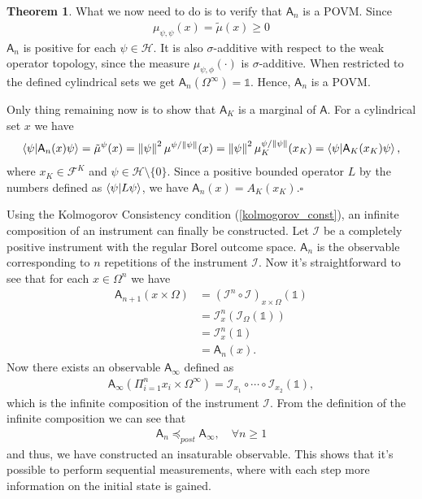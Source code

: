 \documentclass[a4paper,12pt]{wihuri}
\theoremstyle{definition}
\newtheorem{theorem}{Theorem}
\numberwithin{definition}{section}
\numberwithin{example}{section}
\numberwithin{theorem}{section}
\numberwithin{proposition}{section}
\numberwithin{lemma}{section}
\newcommand{\I}{\mathcal{I}}%
\newcommand{\hi}{\mathcal{H}}%
\newcommand{\salg}{\mathcal{F}}%
\newcommand{\A}{\mathsf{A}}%
\newcommand{\id}{\mathds{1}}
\newcommand{\norm}[1]{\left\lVert#1\right\rVert}
\newcommand{\pp}{\preceq_{post}}
\begin{document}
\begin{theorem}
What we now need to do is to verify that $\A_n$ is a POVM. Since
\begin{align*}
\mu_{\psi,\psi}(x) = \tilde{\mu}(x) \geq 0
\end{align*}
$\A_n$ is positive for each $\psi \in \hi$. It is also $\sigma$-additive with respect to the weak operator topology, since the measure $\mu_{\psi,\phi}(\cdot)$ is $\sigma$-additive. When restricted to the defined cylindrical sets we get $\A_n(\Omega^\infty) = \id$. Hence, $\A_n$ is a POVM. 

Only thing remaining now is to show that $\A_K$ is a marginal of $\A$. For a cylindrical set $x$ we have
\begin{align*}
 \braket{\psi| \A_n(x)\psi} = \tilde{\mu}^\psi(x) = \norm{\psi}^2\mu^{\psi/\norm{\psi}}(x) = \norm{\psi}^2\mu_K^{\psi/\norm{\psi}}(x_K) = \braket{\psi|\A_K(x_K)\psi},
\end{align*}
where $x_K \in \salg^K$ and $\psi \in \hi \setminus \{0\}$. Since a positive bounded operator $L$ by the numbers defined as $\braket{\psi|L\psi}$, we have $\A_n(x) = A_K(x_K)$.\hfill $\square$
\end{theorem}
Using the Kolmogorov Consistency condition (\ref{kolmogorov_const}), an infinite composition of an instrument can finally be constructed. Let $\I$ be a completely positive instrument with the regular Borel outcome space. $\A_n$ is the observable corresponding to $n$ repetitions of the instrument $\I$. Now it's straightforward to see that for each $x \in \Omega^n$ we have
\begin{align*}
\A_{n+1}(x\times \Omega) &= (\I^n \circ \I)_{x\times\Omega}(\id) \\
&= \I_x^n(\I_\Omega(\id))\\
&= \I_x^n(\id)\\
&= \A_n(x).
\end{align*}
Now there exists an observable $\A_\infty$ defined as 
\begin{align*}
\A_\infty(\Pi_{i=1}^n x_i \times \Omega^\infty) = \I_{x_1}\circ \cdots \circ \I_{x_2}(\id),
\end{align*}
which is the infinite composition of the instrument $\I$. From the definition of the infinite composition we can see that 
\begin{align*}
\A_n \pp \A_\infty, \quad \forall n \geq 1
\end{align*}
and thus, we have constructed an insaturable observable. This shows that it's possible to perform sequential measurements, where with each step more information on the initial state is gained.
\end{document}
